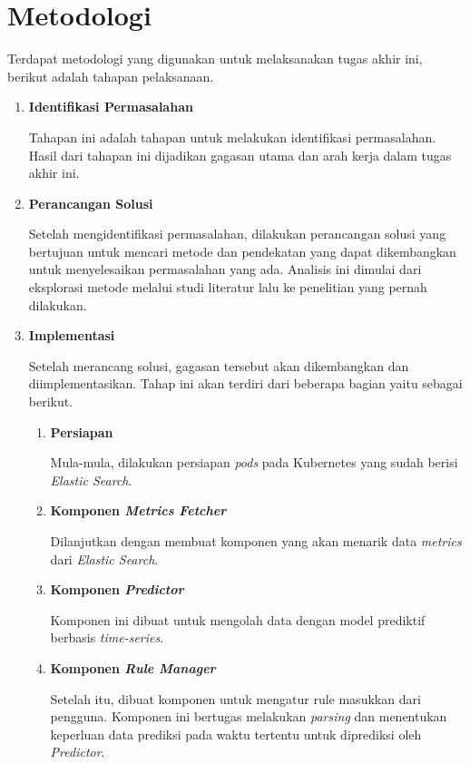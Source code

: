 \section{Metodologi}

Terdapat metodologi yang digunakan untuk melaksanakan tugas akhir ini, berikut adalah tahapan pelaksanaan.
\begin{enumerate}
    \item \textbf{Identifikasi Permasalahan}
    
    Tahapan ini adalah tahapan untuk melakukan identifikasi permasalahan. Hasil dari tahapan ini dijadikan gagasan utama dan arah kerja dalam tugas akhir ini.

    \item \textbf{Perancangan Solusi}
    
    Setelah mengidentifikasi permasalahan, dilakukan perancangan solusi yang bertujuan untuk mencari metode dan pendekatan yang dapat dikembangkan untuk menyelesaikan permasalahan yang ada. Analisis ini dimulai dari eksplorasi metode melalui studi literatur lalu ke penelitian yang pernah dilakukan.

    \item \textbf{Implementasi}
    
    Setelah merancang solusi, gagasan tersebut akan dikembangkan dan diimplementasikan. Tahap ini akan terdiri dari beberapa bagian yaitu sebagai berikut.
    \begin{enumerate}
        \item \textbf{Persiapan}
    
        Mula-mula, dilakukan persiapan \textit{pods} pada Kubernetes yang sudah berisi \textit{Elastic Search}.


        \item \textbf{Komponen \textit{Metrics Fetcher}}
        
        Dilanjutkan dengan membuat komponen yang akan menarik data \textit{metrics} dari \textit{Elastic Search}.

        \item \textbf{Komponen \textit{Predictor}}
        
        Komponen ini dibuat untuk mengolah data dengan model prediktif berbasis \textit{time-series}.

        \item \textbf{Komponen \textit{Rule Manager}}
        
        Setelah itu, dibuat komponen untuk mengatur rule masukkan dari pengguna. Komponen ini bertugas melakukan \textit{parsing} dan menentukan keperluan data prediksi pada waktu tertentu untuk diprediksi oleh \textit{Predictor}.


\end{enumerate}
\end{enumerate}
